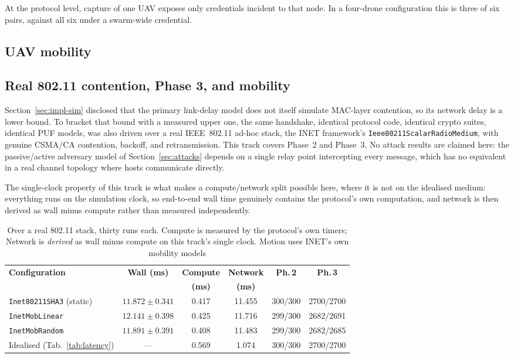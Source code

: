 \documentclass[journal]{IEEEtran}
\begin{document}
At the protocol level, capture of one UAV exposes only credentials incident to
that node. In a four-drone configuration this is three of six pairs, against
all six under a swarm-wide credential.

\subsection{UAV mobility}

\subsection{Real 802.11 contention, Phase 3, and mobility}
\label{sec:inet}

Section~\ref{sec:impl-sim} disclosed that the primary link-delay model does not
itself simulate MAC-layer contention, so its network delay is a lower bound. To
bracket that bound with a measured upper one, the same handshake, identical
protocol code, identical crypto suites, identical PUF models, was also driven
over a real IEEE~802.11 ad-hoc stack, the INET framework's
\texttt{Ieee80211ScalarRadioMedium}, with genuine CSMA/CA contention, backoff,
and retransmission. This track covers Phase~2 and Phase~3. No attack results are
claimed here: the passive/active adversary model of Section~\ref{sec:attacks}
depends on a single relay point intercepting every message, which has no
equivalent in a real channel topology where hosts communicate directly.

The single-clock property of this track is what makes a compute/network split
possible here, where it is not on the idealised medium: everything runs on the
simulation clock, so end-to-end wall time genuinely contains the protocol's own
computation, and network is then derived as wall minus compute rather than
measured independently.

\begin{table}[H]
\centering
\caption{Over a real 802.11 stack, thirty runs each. Compute is measured by the
protocol's own timers; Network is \emph{derived} as wall minus compute on this
track's single clock. Motion uses INET's own mobility models}
\label{tab:inet}
\scriptsize
\setlength{\tabcolsep}{2.0pt}
\begin{tabular}{@{}lccccc@{}}
\toprule
\textbf{Configuration} & \textbf{Wall (ms)} & \textbf{Compute} &
\textbf{Network} & \textbf{Ph.\,2} & \textbf{Ph.\,3} \\
 & & \textbf{(ms)} & \textbf{(ms)} & & \\
\midrule
\texttt{Inet80211SHA3} (static) & $11.872{\pm}0.341$ & 0.417 & 11.455 & 300/300 & 2700/2700 \\
\texttt{InetMobLinear}          & $12.141{\pm}0.398$ & 0.425 & 11.716 & 299/300 & 2682/2691 \\
\texttt{InetMobRandom}          & $11.891{\pm}0.391$ & 0.408 & 11.483 & 299/300 & 2682/2685 \\
\midrule
Idealised (Tab.\ \ref{tab:latency}) & --- & 0.569 & 1.074 & 300/300 & 2700/2700 \\
\bottomrule
\end{tabular}
\end{table}
\end{document}

